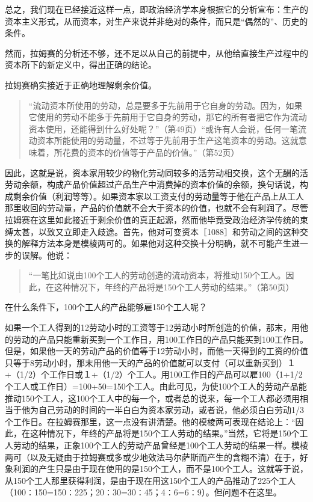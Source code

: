 总之，我们现在已经接近这样一点，即政治经济学本身根据它的分析宣布：生产的资本主义形式，从而资本，对生产来说并非绝对的条件，而只是“偶然的”、历史的条件。

然而，拉姆赛的分析还不够，还不足以从自己的前提中，从他给直接生产过程中的资本所下的新定义中，得出正确的结论。


拉姆赛确实接近于正确地理解剩余价值。

\begin{quote}{“流动资本所使用的劳动，总是要多于先前用于它自身的劳动。因为，如果它使用的劳动不能多于先前用于它自身的劳动，那它的所有者把它作为流动资本使用，还能得到什么好处呢？”（第49页）“或许有人会说，任何一笔流动资本所能使用的劳动量，不过等于先前用于生产这笔资本的劳动。这就意味着，所花费的资本的价值等于产品的价值。”（第52页）}\end{quote}

因此，这就是说，资本家用较少的物化劳动同较多的活劳动相交换，这个无酬的活劳动余额，构成产品价值超过产品生产中消费掉的资本价值的余额，换句话说，构成剩余价值（利润等等）。如果资本家以工资支付的劳动量等于他在产品上从工人那里收回的劳动量，产品的价值就不会大于资本的价值，也就不会有利润了。尽管拉姆赛在这里如此接近于剩余价值的真正起源，然而他毕竟受政治经济学传统的束缚太甚，以致又立即走入歧途。首先，他对可变资本［1088］和劳动之间的这种交换的解释方法本身是模棱两可的。如果他对这种交换十分明确，就不可能产生进一步的误解。他说：

\begin{quote}{“一笔比如说由100个工人的劳动创造的流动资本，将推动150个工人。因此，在这种情况下，年终的产品将是150个工人劳动的结果。”（第50页）}\end{quote}

在什么条件下，100个工人的产品能够雇150个工人呢？

如果一个工人得到的12劳动小时的工资等于12劳动小时所创造的价值，那末，用他的劳动的产品只能重新买到一个工作日，用100工作日的产品只能买到100工作日。但是，如果他一天的劳动产品的价值等于12劳动小时，而他一天得到的工资的价值只等于8劳动小时，那末用他一天的产品的价值就可以支付（可以重新买到）１+（1/2）个工作日或１+（1/2）个工人。用100工作日的产品可以雇100（1+1/2个工人或工作日）=100+50=150个工人。由此可见，为使100个工人的劳动产品能推动150个工人，这100个工人中的每一个，或者总的说来，每一个工人都必须用相当于他为自己劳动的时间的一半白白为资本家劳动，或者说，他必须白白劳动1/3个工作日。在拉姆赛那里，这一点没有讲清楚。他的模棱两可表现在结论上：“因此，在这种情况下，年终的产品将是150个工人劳动的结果。”当然，它将是150个工人劳动的结果，正象100个工人的劳动产品曾经是100个工人劳动的结果一样。模棱两可（以及无疑由于拉姆赛或多或少地效法马尔萨斯而产生的含糊不清）在于，好象利润的产生只是由于现在使用的是150个工人，而不是100个工人。这就等于说，从150个工人那里获得利润，是由于现在用这150个工人的产品推动了225个工人（100∶150=150∶225；20∶30=30∶45；4∶6=6∶9）。但问题不在这里。

